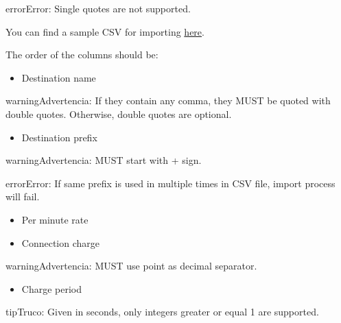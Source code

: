 \documentclass[letterpaper,10pt,spanish]{sphinxmanual}
\begin{document}
\begin{notice}{error}{Error:}
Single quotes are not supported.
\end{notice}

You can find a sample CSV for importing \href{https://raw.githubusercontent.com/irontec/ivozprovider/artemis/web/admin/samples/pricesSample.csv}{here}.

The order of the columns should be:
\begin{itemize}
\item {} 
Destination name

\end{itemize}

\begin{notice}{warning}{Advertencia:}
If they contain any comma, they MUST be quoted with double quotes. Otherwise, double quotes are optional.
\end{notice}
\begin{itemize}
\item {} 
Destination prefix

\end{itemize}

\begin{notice}{warning}{Advertencia:}
MUST start with + sign.
\end{notice}

\begin{notice}{error}{Error:}
If same prefix is used in multiple times in CSV file, import process will fail.
\end{notice}
\begin{itemize}
\item {} 
Per minute rate

\item {} 
Connection charge

\end{itemize}

\begin{notice}{warning}{Advertencia:}
MUST use point as decimal separator.
\end{notice}
\begin{itemize}
\item {} 
Charge period

\end{itemize}

\begin{notice}{tip}{Truco:}
Given in seconds, only integers greater or equal 1 are supported.
\end{notice}
\end{document}
